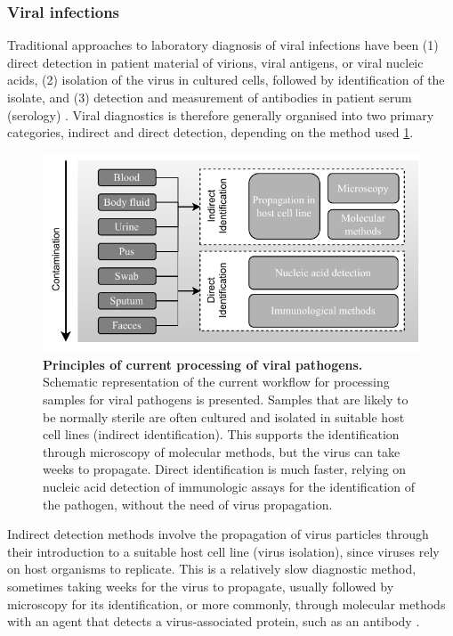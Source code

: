 \subsubsection{Viral infections} \label{sssec:_intro_viral}

Traditional approaches to laboratory diagnosis of viral infections have been (1) direct detection in patient material of virions, viral antigens, or viral nucleic acids, (2) isolation of the virus in cultured cells, followed by identification of the isolate, and (3) detection and measurement of antibodies in patient serum (serology) \citep{burrell_laboratory_2017}. 
Viral diagnostics is therefore generally organised into two primary categories, indirect and direct detection, depending on the method used \ref{fig:figure_viral}. 

\begin{figure}[h!]
\centering
\includegraphics[width=\textwidth]{figures/introduction/viral.pdf}
\caption{\textbf{Principles of current processing of viral pathogens.} Schematic representation of the current workflow for processing samples for viral pathogens is presented. Samples that are likely to be normally sterile are often cultured and isolated in suitable host cell lines (indirect identification). This supports the identification through microscopy of molecular methods, but the virus can take weeks to propagate. Direct identification is much faster, relying on nucleic acid detection of immunologic assays for the identification of the pathogen, without the need of virus propagation.}
\label{fig:figure_viral}
\end{figure}

Indirect detection methods involve the propagation of virus particles through their introduction to a suitable host cell line (virus isolation), since viruses rely on host organisms to replicate. 
This is a relatively slow diagnostic method, sometimes taking weeks for the virus to propagate, usually followed by microscopy for its identification, or more commonly, through molecular methods with an agent that detects a virus-associated protein, such as an antibody \citep{cassedy_virus_2021}. 

